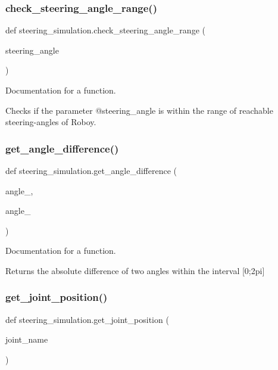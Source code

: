 \subsubsection{\texorpdfstring{check\_steering\_angle\_range()}{check\_steering\_angle\_range()}}
{\footnotesize\ttfamily def steering\+\_\+simulation.\+check\+\_\+steering\+\_\+angle\+\_\+range (\begin{DoxyParamCaption}\item[{}]{steering\+\_\+angle }\end{DoxyParamCaption})}



Documentation for a function. 

Checks if the parameter @steering\+\_\+angle is within the range of reachable steering-\/angles of Roboy. \mbox{\label{namespacesteering__simulation_a920f69692c79162b2296b1a220bba527}} 
\subsubsection{\texorpdfstring{get\_angle\_difference()}{get\_angle\_difference()}}
{\footnotesize\ttfamily def steering\+\_\+simulation.\+get\+\_\+angle\+\_\+difference (\begin{DoxyParamCaption}\item[{}]{angle\+\_,  }\item[{}]{angle\+\_ }\end{DoxyParamCaption})}



Documentation for a function. 

Returns the absolute difference of two angles within the interval \mbox{[}0;2pi\mbox{]} \mbox{\label{namespacesteering__simulation_af5611a9446037e0aee0542ebe1c111fc}} 
\subsubsection{\texorpdfstring{get\_joint\_position()}{get\_joint\_position()}}
{\footnotesize\ttfamily def steering\+\_\+simulation.\+get\+\_\+joint\+\_\+position (\begin{DoxyParamCaption}\item[{}]{joint\+\_\+name }\end{DoxyParamCaption})}



